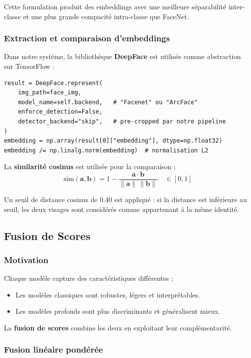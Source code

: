 \documentclass[12pt,a4paper]{article}
\begin{document}
Cette formulation produit des embeddings avec une meilleure séparabilité
inter-classe et une plus grande compacité intra-classe que FaceNet.

\subsubsection{Extraction et comparaison d'embeddings}

Dans notre système, la bibliothèque \textbf{DeepFace} est utilisée comme
abstraction sur TensorFlow :

\begin{lstlisting}[caption={Extraction d'embedding (deep\_model.py)}]
result = DeepFace.represent(
    img_path=face_img,
    model_name=self.backend,   # "Facenet" ou "ArcFace"
    enforce_detection=False,
    detector_backend="skip",   # pre-cropped par notre pipeline
)
embedding = np.array(result[0]["embedding"], dtype=np.float32)
embedding /= np.linalg.norm(embedding)  # normalisation L2
\end{lstlisting}

La \textbf{similarité cosinus} est utilisée pour la comparaison :
\[
  \text{sim}(\mathbf{a}, \mathbf{b}) = 1 - \frac{\mathbf{a} \cdot \mathbf{b}}
  {\|\mathbf{a}\|\,\|\mathbf{b}\|}
  \quad\in [0, 1]
\]

Un seuil de distance cosinus de 0.40 est appliqué : si la distance est
inférieure au seuil, les deux visages sont considérés comme appartenant à la
même identité.

\subsection{Fusion de Scores}

\subsubsection{Motivation}

Chaque modèle capture des caractéristiques différentes :
\begin{itemize}
  \item Les modèles classiques sont robustes, légers et interprétables.
  \item Les modèles profonds sont plus discriminants et généralisent mieux.
\end{itemize}

La \textbf{fusion de scores} combine les deux en exploitant leur
complémentarité.

\subsubsection{Fusion linéaire pondérée}
\end{document}
